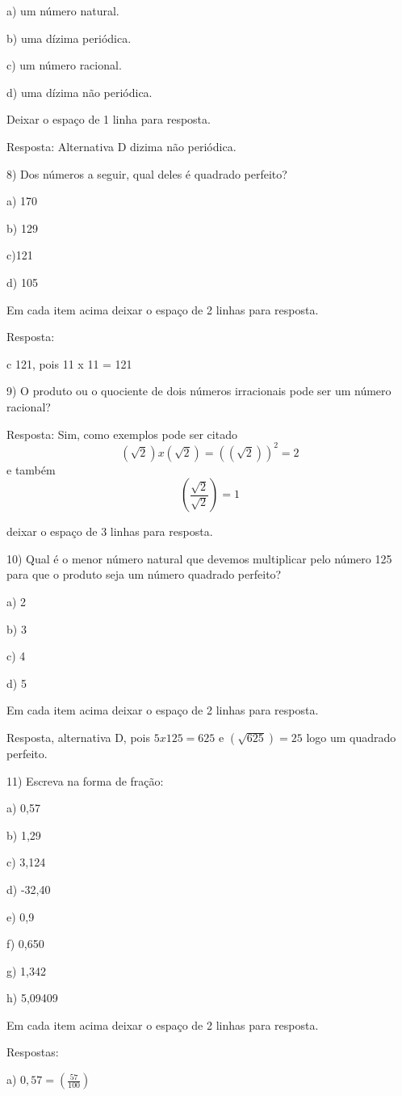 a) um número natural.

b) uma dízima periódica.

c) um número racional.

d) uma dízima não periódica.

Deixar o espaço de 1 linha para resposta.

Resposta: Alternativa D dizima não periódica.

8) Dos números a seguir, qual deles é quadrado perfeito?

a) 170

b) 129

c)121

d) 105

Em cada item acima deixar o espaço de 2 linhas para resposta.

Resposta:

c 121, pois 11 x 11 = 121

9) O produto ou o quociente de dois números irracionais pode ser um
número racional?

Resposta: Sim, como exemplos pode ser citado 
$$(\sqrt{2}) x (\sqrt{2}) = ((\sqrt{2}))^2 = 2$$ 
e também 
$$(\frac{\sqrt{2}}{\sqrt{2}}) = 1$$

deixar o espaço de 3 linhas para resposta.


10) Qual é o menor número natural que devemos multiplicar pelo número
125 para que o produto seja um número quadrado perfeito?

a) 2

b) 3

c) 4

d) 5

Em cada item acima deixar o espaço de 2 linhas para resposta.

Resposta, alternativa D, pois $5 x 125 = 625$ e $(\sqrt{625}) = 25$ logo
um quadrado perfeito.

11) Escreva na forma de fração:

a) 0,57

b) 1,29

c) 3,124

d) -32,40

e) 0,9

f) 0,650

g) 1,342

h) 5,09409

Em cada item acima deixar o espaço de 2 linhas para resposta.

Respostas:

a) $0,57 = (\frac{57}{100})$

